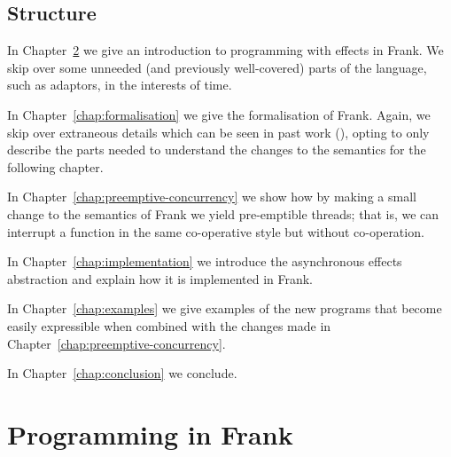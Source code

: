\documentclass[msc,deptreport,cs]{infthesis} %
\begin{document}

\section{Structure}

In Chapter~\ref{chap:programming-in-frank} we give an introduction to
programming with effects in Frank. We skip over some unneeded (and previously
well-covered) parts of the language, such as adaptors, in the interests of time.

In Chapter~\ref{chap:formalisation} we give the formalisation of Frank. Again,
we skip over extraneous details which can be seen in past work
(\cite{convent2020doo}), opting to only describe the parts needed to understand
the changes to the semantics for the following chapter.

In Chapter~\ref{chap:preemptive-concurrency} we show how by making a small
change to the semantics of Frank we yield pre-emptible threads; that is, we can
interrupt a function in the same co-operative style but without co-operation.

In Chapter~\ref{chap:implementation} we introduce the asynchronous effects
abstraction and explain how it is implemented in Frank.

In Chapter~\ref{chap:examples} we give examples of the new programs that become
easily expressible when combined with the changes made in
Chapter~\ref{chap:preemptive-concurrency}.

In Chapter~\ref{chap:conclusion} we conclude.



\chapter{Programming in Frank}
\label{chap:programming-in-frank}
\end{document}
